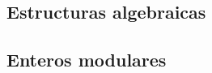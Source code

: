 \subsection{Estructuras algebraicas}\label{subsec:estructuras}


\subsection{Enteros modulares}\label{subsec:modulares}



